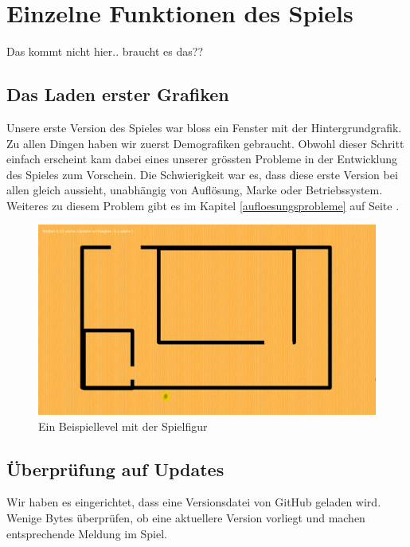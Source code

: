 \documentclass[11pt,a4paper]{scrbook}
\begin{document}
\newpage
\section{Einzelne Funktionen des Spiels}

Das kommt nicht hier.. braucht es das??
\subsection{Das Laden erster Grafiken}
Unsere erste Version des Spieles war bloss ein Fenster mit der Hintergrundgrafik.
Zu allen Dingen haben wir zuerst Demografiken gebraucht.
Obwohl dieser Schritt einfach erscheint kam dabei eines unserer grössten Probleme in der Entwicklung des Spieles zum Vorschein.
Die Schwierigkeit war es, dass diese erste Version bei allen gleich aussieht, unabhängig von Auflösung, Marke oder Betriebssystem.
Weiteres zu diesem Problem gibt es im Kapitel \ref{aufloesungsprobleme} auf Seite \pageref{aufloesungsprobleme}.


\begin{figure}[h]
\centering
\includegraphics[scale=0.25]{img/grafiken.png}
\caption{Ein Beispiellevel mit der Spielfigur}
\end{figure}


\subsection{Überprüfung auf Updates}
Wir haben es eingerichtet, dass eine Versionsdatei von GitHub geladen wird. Wenige Bytes überprüfen, ob eine aktuellere Version vorliegt und machen entsprechende Meldung im Spiel.
\end{document}
